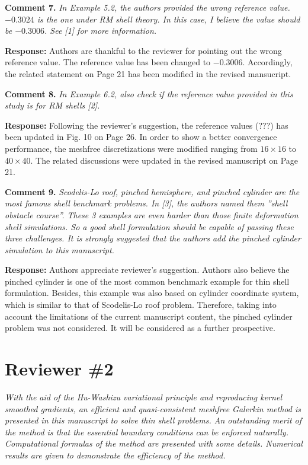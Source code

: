 \documentclass{article}
\begin{document}
\textbf{Comment 7.} \textit{In Example 5.2, the authors provided the wrong reference value. $-0.3024$ is the one under RM shell theory. In this case, I believe the value should be $-0.3006$. See [1] for more information.}

\textbf{Response:} Authors are thankful to the reviewer for pointing out the wrong reference value. The reference value has been changed to $-0.3006$. Accordingly, the related statement on Page 21 has been modified in the revised mansucript.

\textbf{Comment 8.} \textit{In Example 6.2, also check if the reference value provided in this study is for RM shells [2].}

\textbf{Response:} Following the reviewer's suggestion, the reference values (???) has been updated in Fig. 10 on Page 26. In order to show a better convergence performance, the meshfree discretizations were modified ranging from $16\times16$ to $40\times40$. The related discussions were updated in the revised manuscript on Page 21. 

\textbf{Comment 9.} \textit{Scodelis-Lo roof, pinched hemisphere, and pinched cylinder are the most famous shell benchmark problems. In [3], the authors named them ”shell obstacle course”. These 3 examples are even harder than those finite deformation shell simulations. So a good shell formulation should be capable of passing these three challenges. It is strongly suggested that the authors add the pinched cylinder simulation to this manuscript.}

\textbf{Response:} Authors appreciate reviewer's suggestion. Authors also believe the pinched cylinder is one of the most common benchmark example for thin shell formulation. Besides, this example was also based on cylinder coordinate system, which is similar to that of Scodelis-Lo roof problem. Therefore, taking into account the limitations of the current manuscript content, the pinched cylinder problem was not considered. It will be considered as a  further prospective.

\section*{Reviewer \#2}
\textit{With the aid of the Hu-Washizu variational principle and reproducing kernel smoothed gradients, an efficient and quasi-consistent meshfree Galerkin method is presented in this manuscript to solve thin shell problems. An outstanding merit of the method is that the essential boundary conditions can be enforced naturally. Computational formulas of the method are presented with some details. Numerical results are given to demonstrate the efficiency of the method.}
\end{document}
